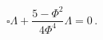 \begin{equation}
\square \Lambda +\frac{5-\Phi ^{2}}{4\Phi ^{4}}\Lambda =0\,.  \label{EoM2}
\end{equation}


